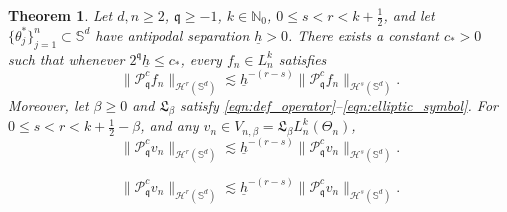 \documentclass[10pt,a4paper]{amsart}
\newtheorem{theorem}{Theorem}
\def\NN{\mathbb{N}}
\def\SS{\mathbb{S}}
\def\mq{\mathfrak{q}}
\def\pc{\mathcal{P}^c}
\begin{document}
\begin{theorem}\label{thm_inverse_hig_freq}
    Let $d,n\geq2$, $\mq\geq-1$, $k\in\NN_0$, $0\leq s<r< k+\frac{1}{2}$, and let $\{\theta_j^*\}_{j=1}^n\subset\SS^d$ have antipodal separation $\underline h>0$. There exists a constant $c_*>0$ such that whenever $2^\mq\underline h\leq c_*$, every $f_n\in L_n^k$ satisfies
    \begin{equation}\label{eqn_inver_highfre}
        \|\pc_\mq f_n\|_{\mathcal{H}^r(\SS^d)}\lesssim 
        \underline{h}^{-(r-s)}\|\pc_\mq f_n\|_{\mathcal{H}^s(\SS^d)}.
    \end{equation}
    Moreover, let $\beta\geq0$ and $\mathfrak L_\beta$ satisfy \eqref{eqn:def_operator}--\eqref{eqn:elliptic_symbol}. For $0\leq s<r< k+\frac{1}{2}-\beta$, and any $v_n\in V_{n,\beta}=\mathfrak{L}_\beta L_n^k(\Theta_n)$,
\begin{equation}\label{eqn:filtered_residual_bernstein}
\|\mathcal P_{\mathfrak q}^c v_n\|_{\mathcal H^{r}(\SS^d)}\lesssim\underline h^{-(r-s)}\|\mathcal P_{\mathfrak q}^c v_n\|_{\mathcal H^{s}(\SS^d)}.
\end{equation}
\end{theorem}

\begin{equation}
\|\mathcal P_{\mathfrak q}^c v_n\|_{\mathcal H^{r}(\SS^d)}\lesssim\underline h^{-(r-s)}\|\mathcal P_{\mathfrak q}^c v_n\|_{\mathcal H^{s}(\SS^d)}.
\end{equation}
\end{document}
